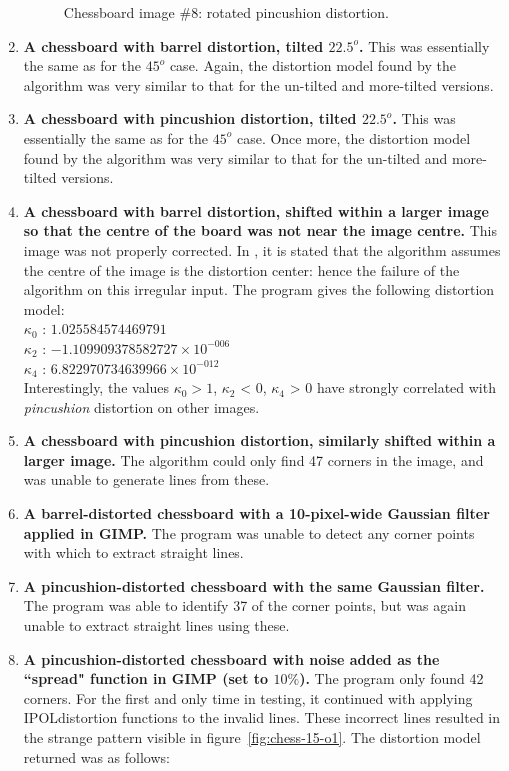 \begin{enumerate}
\begin{figure}[H]
  \caption{Chessboard image \#8: rotated pincushion distortion.}
  \label{fig:chess-8}
\end{figure}
  \item \textbf{A chessboard with barrel distortion, tilted $22.5^o$.} This was essentially the same as for the $45^o$ case. Again, the distortion model found by the algorithm was very similar to that for the un-tilted and more-tilted versions.
  \item \textbf{A chessboard with pincushion distortion, tilted $22.5^o$.} This was essentially the same as for the $45^o$ case. Once more, the distortion model found by the algorithm was very similar to that for the un-tilted and more-tilted versions.
  \item \textbf{A chessboard with barrel distortion, shifted within a larger image so that the centre of the board was not near the image centre.} This image was not properly corrected. In \cite{algebraic-distortion}, it is stated that the algorithm assumes the centre of the image is the distortion center: hence the failure of the algorithm on this irregular input. The program gives the following distortion model:\\
   $ \kappa_{0}$ : $1.025584574469791$\\
   $ \kappa_{2}$ : $-1.109909378582727 \times 10^{-006}$\\
   $ \kappa_{4}$ : $6.822970734639966 \times 10^{-012}$\\
   Interestingly, the values $\kappa_{0} > 1$, $\kappa_{2}$ < 0, $\kappa_{4}$ > 0 have strongly correlated with \emph{pincushion} distortion on other images.
  \item \textbf{A chessboard with pincushion distortion, similarly shifted within a larger image.} The algorithm could only find 47 corners in the image, and was unable to generate lines from these.
  \item \textbf{A barrel-distorted chessboard with a 10-pixel-wide Gaussian filter applied in GIMP.} The program was unable to detect any corner points with which to extract straight lines.
  \item \textbf{A pincushion-distorted chessboard with the same Gaussian filter.} The program was able to identify 37 of the corner points, but was again unable to extract straight lines using these.
  \item \textbf{A pincushion-distorted chessboard with noise added as the ``spread" function in GIMP (set to $10\%$).} The program only found 42 corners. For the first and only time in testing, it continued with applying IPOLdistortion functions to the invalid lines. These incorrect lines resulted in the strange pattern visible in figure~\ref{fig:chess-15-o1}. The distortion model returned was as follows:\\

\end{enumerate}
